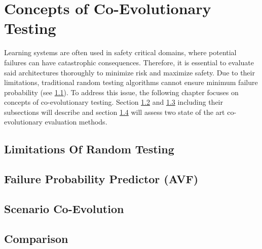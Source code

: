 \section{Concepts of Co-Evolutionary Testing}
\label{testing}
Learning systems are often used in safety critical domains, where potential failures can have catastrophic consequences. Therefore, it is essential to evaluate said architectures thoroughly to minimize risk and maximize safety. Due to their limitations, traditional random testing algorithms cannot ensure minimum failure probability (see \ref{limitations}). To address this issue, the following chapter focuses on concepts of co-evolutionary testing. Section \ref{avf} and \ref{coevolution} including their subsections will describe and section \ref{comparison} will assess two state of the art co-evolutionary evaluation methods.


\subsection{Limitations Of Random Testing}
\label{limitations}



\subsection{Failure Probability Predictor (AVF)}
\label{avf}



\subsection{Scenario Co-Evolution}
\label{coevolution}


\subsection{Comparison}
\label{comparison}

